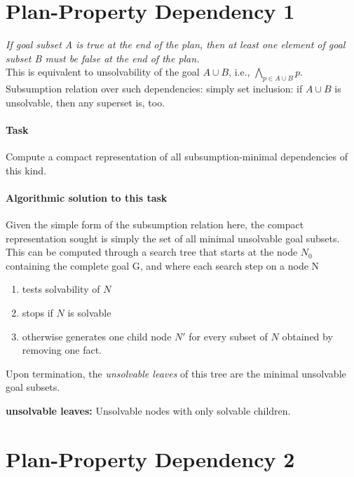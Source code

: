 \documentclass[12pt]{article}
\begin{document}
\section{Plan-Property Dependency 1}

\textit{If goal subset A is true at the end of the plan, then at least 
one element of goal subset B must be false at the end of the plan.}\\

\noindent
This is equivalent to unsolvability of the goal 
$A \cup B$, i.e., $\bigwedge_{p \in A \cup B} p$.
\noindent
Subsumption relation over such dependencies: simply set inclusion: 
if $A \cup B$ is unsolvable, then any superset is, too.

\paragraph{Task} 
Compute a compact representation of all subsumption-minimal dependencies 
of this kind.

\paragraph{Algorithmic solution to this task} 
Given the simple form of the subsumption relation here, the compact 
representation sought is simply the set of all minimal unsolvable goal 
subsets. This can be computed through a search tree that starts at the 
node $N_0$ containing the complete goal G, and where each search step 
on a node N 

\begin{enumerate}
	\item tests solvability of $N$
	\item  stops if $N$ is solvable
	\item otherwise generates one child node $N'$ for every subset of $N$
	 obtained by removing one fact. 

\end{enumerate}

\noindent
Upon termination, the \textit{unsolvable leaves} of this tree are the minimal 
unsolvable goal subsets.

\textbf{unsolvable leaves:} Unsolvable nodes with only solvable children.


\section{Plan-Property Dependency 2}
\end{document}
